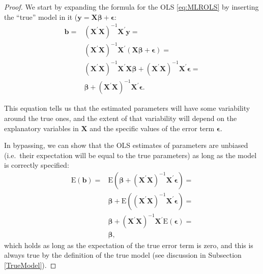 \documentclass[
]{book}
\theoremstyle{definition}
\theoremstyle{definition}
\theoremstyle{definition}
\theoremstyle{definition}
\theoremstyle{remark}
\begin{document}
\begin{proof}
We start by expanding the formula for the OLS \eqref{eq:MLROLS} by inserting the ``true'' model in it (\({\mathbf{y} = \mathbf{X}} {\boldsymbol{\beta}} + {\boldsymbol{\epsilon}}\):
\begin{equation}
\begin{aligned}
{\boldsymbol{b}} =
& \left( {\mathbf{X}}^\prime {\mathbf{X}} \right)^{-1} {\mathbf{X}}^\prime {\mathbf{y}} = \\
& \left( {\mathbf{X}}^\prime {\mathbf{X}} \right)^{-1} {\mathbf{X}}^\prime ({\mathbf{X}} {\boldsymbol{\beta}} + {\boldsymbol{\epsilon}}) = \\
& \left( {\mathbf{X}}^\prime {\mathbf{X}} \right)^{-1} {\mathbf{X}}^\prime {\mathbf{X}} {\boldsymbol{\beta}} + \left( {\mathbf{X}}^\prime {\mathbf{X}} \right)^{-1} {\mathbf{X}}^\prime {\boldsymbol{\epsilon}} = \\
& {\boldsymbol{\beta}} + \left( {\mathbf{X}}^\prime {\mathbf{X}} \right)^{-1} {\mathbf{X}}^\prime {\boldsymbol{\epsilon}} .
\end{aligned}
\label{eq:MLROLSExpansion}
\end{equation}

This equation tells us that the estimated parameters will have some variability around the true ones, and the extent of that variability will depend on the explanatory variables in \(\mathbf{X}\) and the specific values of the error term \(\boldsymbol{\epsilon}\).

In bypassing, we can show that the OLS estimates of parameters are unbiased (i.e.~their expectation will be equal to the true parameters) as long as the model is correctly specified:
\begin{equation}
\begin{aligned}
\mathrm{E}\left(\boldsymbol{b}\right) =
& \mathrm{E}\left({\boldsymbol{\beta}} + \left( {\mathbf{X}}^\prime {\mathbf{X}} \right)^{-1} {\mathbf{X}}^\prime {\boldsymbol{\epsilon}}\right) = \\
& {\boldsymbol{\beta}} + \mathrm{E}\left( \left( {\mathbf{X}}^\prime {\mathbf{X}} \right)^{-1} {\mathbf{X}}^\prime {\boldsymbol{\epsilon}}\right) = \\
& {\boldsymbol{\beta}} + \left( {\mathbf{X}}^\prime {\mathbf{X}} \right)^{-1} {\mathbf{X}}^\prime \mathrm{E}\left( {\boldsymbol{\epsilon}}\right) = \\
& \boldsymbol{\beta} ,
\end{aligned}
\label{eq:MLRCLSExpansion}
\end{equation}
which holds as long as the expectation of the true error term is zero, and this is always true by the definition of the true model (see discussion in Subsection \ref{TrueModel}).


\end{proof}
\end{document}
